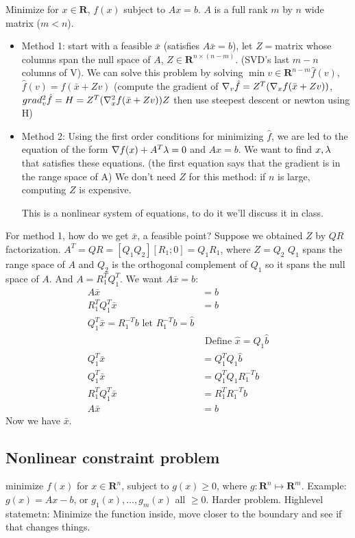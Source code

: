 Minimize for $x\in \mathbf{R}$, $f(x)$ subject to $Ax=b$. $A$ is a
full rank $m$ by $n$ wide matrix ($m<n$).
\begin{itemize}
\item Method 1: start with a feasible $\bar x$ (satisfies $A\bar x =
  b$), let $Z=$matrix whose columns span the null space of $A$, $Z\in
  \mathbf{R}^{n\times (n-m)}$. (SVD's
  last $m-n$ columns of V). We can solve this problem by solving $\min
  v\in \mathbf{R}^{n-m}\hat f(v)$, $\hat f(v) = f(\bar x + Zv)$
  (compute the gradient of $\nabla_v\hat f=Z^T(\nabla_xf(\bar x + Zv))$,
  $grad_v^2 \hat f = H = Z^T(\nabla_x^2f(\bar x + Zv))Z$
  then use steepest descent or newton using H)
\item Method 2: Using the first order conditions for minimizing $\hat
  f$, we are led to the equation of the form $\nabla f(x)+A^T\lambda = 0$
  and $Ax=b$. We want to find $x, \lambda$ that satisfies these
  equations. (the first equation says that the gradient is in the
  range space of A) We don't need $Z$ for this method: if $n$ is
  large, computing $Z$ is expensive. 
  
  This is a nonlinear system of equations, to do it we'll discuss it
  in class.
\end{itemize}

For method 1, how do we get $\bar x$, a feasible point?
Suppose we obtained $Z$ by $QR$ factorization. $A^T=QR= [Q_1 Q_2][R_1;
0] = Q_1R_1$, where $Z=Q_2$ $Q_1$ spans the range space of $A$ and
$Q_2$ is the orthogonal complement of $Q_1$ so it spans the null space
of $A$. And $A=R_1^TQ_1^T$. We want $A\bar x = b$:
\begin{align*} 
  A\bar x &= b\\
R_1^TQ_1^T \bar x &=b\\
Q_1^T \bar x = R_1^{-T}b \text{ let }R_1^{-T}b = \hat b\\
&\text{ Define }\hat x = Q_1\hat b\\
Q_1^T\bar x &=  Q_1^TQ_1 \hat b\\
Q_1^T\bar x &=  Q_1^TQ_1 R_1^{-T}b\\
R_1^TQ_1^T\bar x &=  R_1^TR_1^{-T}b\\
A\bar x &=  b
\end{align*}
Now we have $\bar x$.

\subsection{Nonlinear constraint problem }
minimize $f(x)$ for $x\in \mathbf{R}^n$, subject to $g(x)\ge 0$, where
$g:\mathbf{R}^n \mapsto \mathbf{R}^m$. Example: $g(x) = Ax-b$, or
$g_1(x), \dots, g_m(x)$ all $\ge 0$.
Harder problem.
Highlevel statemetn: Minimize the function inside, move closer to the
boundary and see if that changes things.

